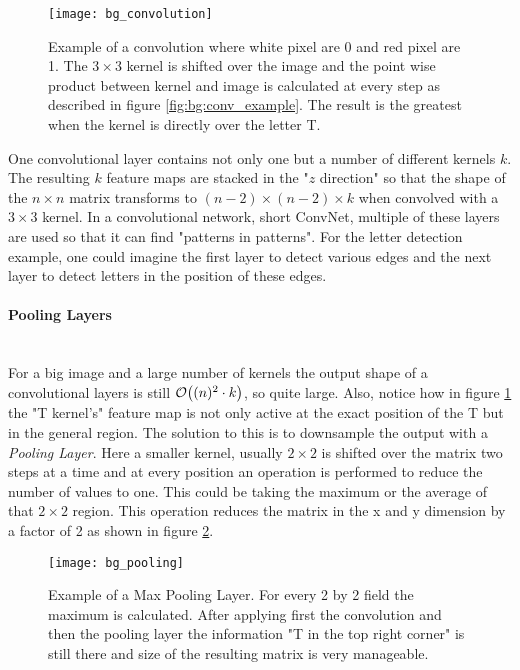  

\begin{figure}[H]
    \centering
    \texttt{[image: bg\_convolution]}
    \caption{Example of a convolution where white pixel are 0 and red pixel are 1. The $3 \times 3$ kernel is shifted over the image and the point wise product between kernel and image is calculated at every step as described in figure \ref{fig:bg:conv_example}. The result is the greatest when the kernel is directly over the letter T.}
    \label{fig:bg:convolution}
\end{figure}

One convolutional layer contains not only one but a number of different kernels $k$. The resulting $k$ feature maps are stacked in the "$z$ direction" so that the shape of the $n \times n$ matrix transforms to $(n-2) \times (n-2) \times k$ when convolved with a $3 \times 3$ kernel. In a convolutional network, short ConvNet, multiple of these layers are used so that it can find "patterns in patterns". For the letter detection example, one could imagine the first layer to detect various edges and the next layer to detect letters in the position of these edges.

\paragraph{Pooling Layers}~\\
For a big image and a large number of kernels the output shape of a convolutional layers is still $\order{(n)^2 \cdot k}$, so quite large. Also, notice how in figure \ref{fig:bg:convolution} the "T kernel's" feature map is not only active at the exact position of the T but in the general region. The solution to this is to downsample the output with a \textit{Pooling Layer}. Here a smaller kernel, usually $2 \times 2$ is shifted over the matrix two steps at a time and at every position an operation is performed to reduce the number of values to one. This could be taking the maximum or the average of that $2 \times 2$ region. This operation reduces the matrix in the x and y dimension by a factor of 2 as shown in figure \ref{fig:bg:pooling}.

\begin{figure}[H]
    \centering
    \texttt{[image: bg\_pooling]}
    \caption{Example of a Max Pooling Layer. For every 2 by 2 field the maximum is calculated. After applying first the convolution and then the pooling layer the information "T in the top right corner" is still there and size of the resulting matrix is very manageable.}
    \label{fig:bg:pooling}
\end{figure}
\vspace{1cm}

